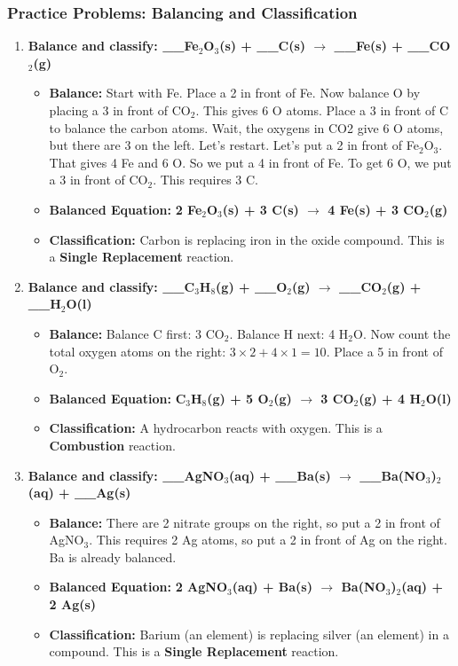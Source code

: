 \documentclass{article}
\begin{document}
\subsubsection*{Practice Problems: Balancing and Classification}
\begin{enumerate}[itemsep=5pt]
    \item \textbf{Balance and classify: \_\_Fe\(_2\)O\(_3\)(s) + \_\_C(s) \(\rightarrow\) \_\_Fe(s) + \_\_CO\(_2\)(g)}
    \begin{itemize}
        \item \textbf{Balance:} Start with Fe. Place a 2 in front of Fe. Now balance O by placing a 3 in front of CO\(_2\). This gives 6 O atoms. Place a 3 in front of C to balance the carbon atoms. Wait, the oxygens in CO2 give 6 O atoms, but there are 3 on the left. Let's restart. Let's put a 2 in front of Fe\(_2\)O\(_3\). That gives 4 Fe and 6 O. So we put a 4 in front of Fe. To get 6 O, we put a 3 in front of CO\(_2\). This requires 3 C.
        \item \textbf{Balanced Equation:} \textbf{2 Fe\(_2\)O\(_3\)(s) + 3 C(s) \(\rightarrow\) 4 Fe(s) + 3 CO\(_2\)(g)}
        \item \textbf{Classification:} Carbon is replacing iron in the oxide compound. This is a \textbf{Single Replacement} reaction.
    \end{itemize}
    \item \textbf{Balance and classify: \_\_C\(_3\)H\(_8\)(g) + \_\_O\(_2\)(g) \(\rightarrow\) \_\_CO\(_2\)(g) + \_\_H\(_2\)O(l)}
    \begin{itemize}
        \item \textbf{Balance:} Balance C first: 3 CO\(_2\). Balance H next: 4 H\(_2\)O. Now count the total oxygen atoms on the right: \(3 \times 2 + 4 \times 1 = 10\). Place a 5 in front of O\(_2\).
        \item \textbf{Balanced Equation:} \textbf{C\(_3\)H\(_8\)(g) + 5 O\(_2\)(g) \(\rightarrow\) 3 CO\(_2\)(g) + 4 H\(_2\)O(l)}
        \item \textbf{Classification:} A hydrocarbon reacts with oxygen. This is a \textbf{Combustion} reaction.
    \end{itemize}
    \item \textbf{Balance and classify: \_\_AgNO\(_3\)(aq) + \_\_Ba(s) \(\rightarrow\) \_\_Ba(NO\(_3\))\(_2\)(aq) + \_\_Ag(s)}
     \begin{itemize}
        \item \textbf{Balance:} There are 2 nitrate groups on the right, so put a 2 in front of AgNO\(_3\). This requires 2 Ag atoms, so put a 2 in front of Ag on the right. Ba is already balanced.
        \item \textbf{Balanced Equation:} \textbf{2 AgNO\(_3\)(aq) + Ba(s) \(\rightarrow\) Ba(NO\(_3\))\(_2\)(aq) + 2 Ag(s)}
        \item \textbf{Classification:} Barium (an element) is replacing silver (an element) in a compound. This is a \textbf{Single Replacement} reaction.
    \end{itemize}
\end{enumerate}
\end{document}
